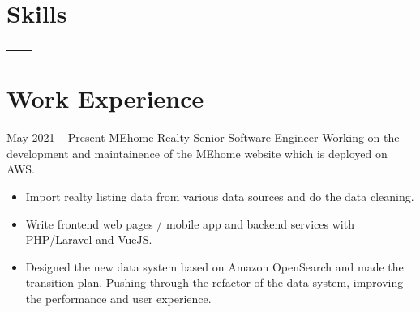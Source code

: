 \documentclass[
	10pt, %
]{FreemanCV}
\begin{document}
\begin{paracol}{2}
\section{Skills}




\begin{supertabular}{r l} %


\end{supertabular}

\medskip %



\section{Work Experience}





\jobentry
	{May 2021 -- Present} %
	{} %
	{MEhome Realty} %
	{Senior Software Engineer} %
	{Working on the development and maintainence of the MEhome website which is deployed on AWS.} %
	\begin{itemize}
        \item Import realty listing data from various data sources and do the data cleaning.
        \item Write frontend web pages / mobile app and backend services with PHP/Laravel and VueJS.
        \item Designed the new data system based on Amazon OpenSearch and made the transition plan. Pushing through the refactor of the data system, improving the performance and user experience.
    \end{itemize}


\end{paracol}
\end{document}
